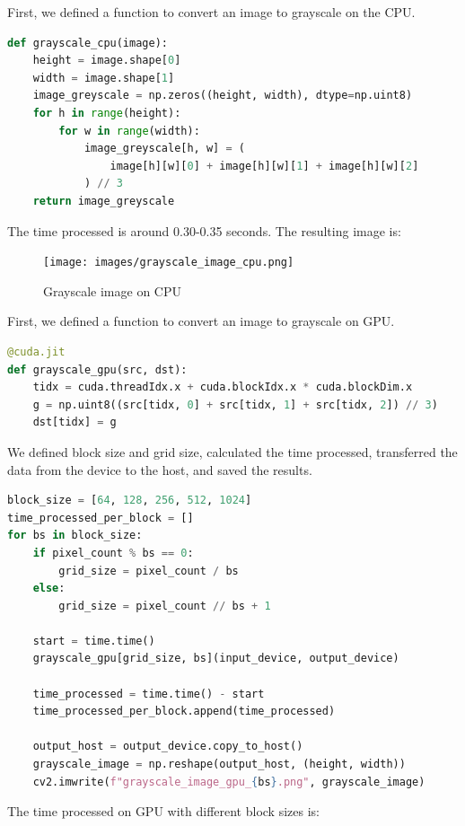 \documentclass[12pt]{article}
\begin{document}
\noindent
First, we defined a function to convert an image to grayscale on the CPU. 

\begin{lstlisting}[language=Python]
def grayscale_cpu(image):
    height = image.shape[0]
    width = image.shape[1]
    image_greyscale = np.zeros((height, width), dtype=np.uint8)
    for h in range(height):
        for w in range(width):
            image_greyscale[h, w] = (
                image[h][w][0] + image[h][w][1] + image[h][w][2]
            ) // 3
    return image_greyscale
\end{lstlisting}

\noindent
The time processed is around 0.30-0.35 seconds. The resulting image is:

\begin{figure}[H]
\centering
    \texttt{[image: images/grayscale\_image\_cpu.png]}
    \caption{Grayscale image on CPU}
\end{figure}

\noindent
First, we defined a function to convert an image to grayscale on GPU. 

\begin{lstlisting}[language=Python]
@cuda.jit
def grayscale_gpu(src, dst):
    tidx = cuda.threadIdx.x + cuda.blockIdx.x * cuda.blockDim.x
    g = np.uint8((src[tidx, 0] + src[tidx, 1] + src[tidx, 2]) // 3)
    dst[tidx] = g
\end{lstlisting}

\noindent
We defined block size and grid size, calculated the time processed, transferred the data from the device to the host, and saved the results.

\begin{lstlisting}[language=Python]
block_size = [64, 128, 256, 512, 1024]
time_processed_per_block = []
for bs in block_size:
    if pixel_count % bs == 0:
        grid_size = pixel_count / bs
    else:
        grid_size = pixel_count // bs + 1

    start = time.time()
    grayscale_gpu[grid_size, bs](input_device, output_device)

    time_processed = time.time() - start
    time_processed_per_block.append(time_processed)

    output_host = output_device.copy_to_host()
    grayscale_image = np.reshape(output_host, (height, width))
    cv2.imwrite(f"grayscale_image_gpu_{bs}.png", grayscale_image)
\end{lstlisting}

\noindent
The time processed on GPU with different block sizes is:
\end{document}
